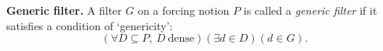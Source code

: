 



\begin{definition}\label{generic}{\bf Generic filter.}
A filter $G$ on a forcing notion $P$ is called a \emph{generic filter} if it satisfies a
condition of `genericity':
$$ %
(\forall D\subseteq P,\ D\ \mbox{dense})(\exists d\in D)(d\in G).
$$ %
\end{definition}


%
%

